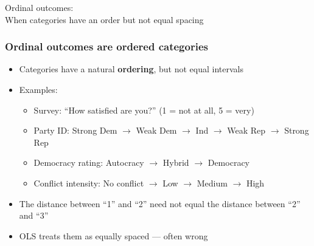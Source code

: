 \begin{transitionframe}
Ordinal outcomes:\\[6pt]
{\large When categories have an order but not equal spacing}
\end{transitionframe}
\note{}

\begin{frame}
\frametitle{Ordinal outcomes are ordered categories}
\centering

\begin{itemize}[<+->]
\item Categories have a natural \textbf{ordering}, but not equal intervals
\vspace{8pt}
\item Examples:
  \begin{itemize}
  \item Survey: ``How satisfied are you?'' (1 = not at all, 5 = very)
  \item Party ID: Strong Dem $\to$ Weak Dem $\to$ Ind $\to$ Weak Rep $\to$ Strong Rep
  \item Democracy rating: Autocracy $\to$ Hybrid $\to$ Democracy
  \item Conflict intensity: No conflict $\to$ Low $\to$ Medium $\to$ High
  \end{itemize}
\vspace{8pt}
\item The distance between ``1'' and ``2'' need not equal the distance between ``2'' and ``3''
\item OLS treats them as equally spaced --- often wrong
\end{itemize}

\end{frame}

